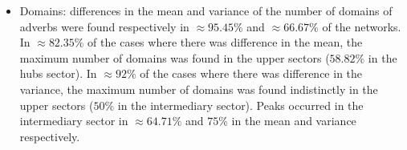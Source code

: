 \begin{itemize}
\begin{itemize}
																																																																																																																																																																																																																																																																																																											\item Domains:
																																																																																																																																																																																																																																																																																																															differences in the mean and variance of the number of domains of adverbs were found respectively in $\approx 95.45\%$ and $\approx 66.67\%$ of the networks.
																																																																																																																																																																																																																																																																																																																			In $\approx 82.35\%$ of the cases where there was difference in the mean, 
																																																																																																																																																																																																																																																																																																																							the maximum number of domains was found in the upper sectors ($58.82\%$ in the hubs sector).
																																																																																																																																																																																																																																																																																																																											In $\approx 92\%$ of the cases where there was difference in the variance, 
																																																																																																																																																																																																																																																																																																																															the maximum number of domains was found indistinctly in the upper sectors ($50\%$ in the intermediary sector).
																																																																																																																																																																																																																																																																																																																																			Peaks occurred in the intermediary sector in $\approx 64.71\%$ and $75\%$ in the mean and variance respectively.

\end{itemize}
\end{itemize}
